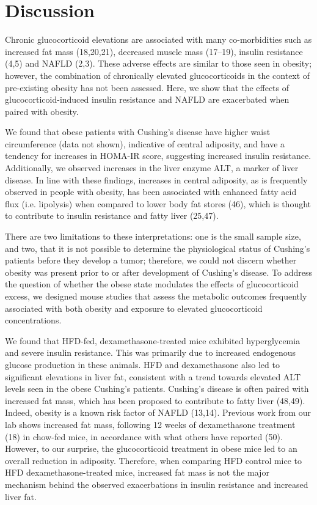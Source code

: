 \documentclass[11pt]{article} %
\begin{document}
\section*{Discussion}

Chronic glucocorticoid elevations are associated with many
co-morbidities such as increased fat mass (18,20,21), decreased muscle
mass (17--19), insulin resistance (4,5) and NAFLD (2,3). These adverse
effects are similar to those seen in obesity; however, the combination
of chronically elevated glucocorticoids in the context of pre-existing
obesity has not been assessed. Here, we show that the effects of
glucocorticoid-induced insulin resistance and NAFLD are exacerbated when
paired with obesity.

We found that obese patients with Cushing's disease have higher waist
circumference (data not shown), indicative of central adiposity, and
have a tendency for increases in HOMA-IR score, suggesting increased
insulin resistance. Additionally, we observed increases in the liver
enzyme ALT, a marker of liver disease. In line with these findings,
increases in central adiposity, as is frequently observed in people with
obesity, has been associated with enhanced fatty acid flux (i.e.
lipolysis) when compared to lower body fat stores (46), which is thought
to contribute to insulin resistance and fatty liver (25,47).

There are two limitations to these interpretations: one is the small
sample size, and two, that it is not possible to determine the
physiological status of Cushing's patients before they develop a tumor;
therefore, we could not discern whether obesity was present prior to or
after development of Cushing's disease. To address the question of
whether the obese state modulates the effects of glucocorticoid excess,
we designed mouse studies that assess the metabolic outcomes frequently
associated with both obesity and exposure to elevated glucocorticoid
concentrations.

We found that HFD-fed, dexamethasone-treated mice exhibited
hyperglycemia and severe insulin resistance. This was primarily due to
increased endogenous glucose production in these animals. HFD and
dexamethasone also led to significant elevations in liver fat,
consistent with a trend towards elevated ALT levels seen in the obese
Cushing's patients. Cushing's disease is often paired with increased fat
mass, which has been proposed to contribute to fatty liver (48,49).
Indeed, obesity is a known risk factor of NAFLD (13,14). Previous work
from our lab shows increased fat mass, following 12 weeks of
dexamethasone treatment (18) in chow-fed mice, in accordance with what
others have reported (50). However, to our surprise, the glucocorticoid
treatment in obese mice led to an overall reduction in adiposity.
Therefore, when comparing HFD control mice to HFD dexamethasone-treated
mice, increased fat mass is not the major mechanism behind the observed
exacerbations in insulin resistance and increased liver fat.
\end{document}
